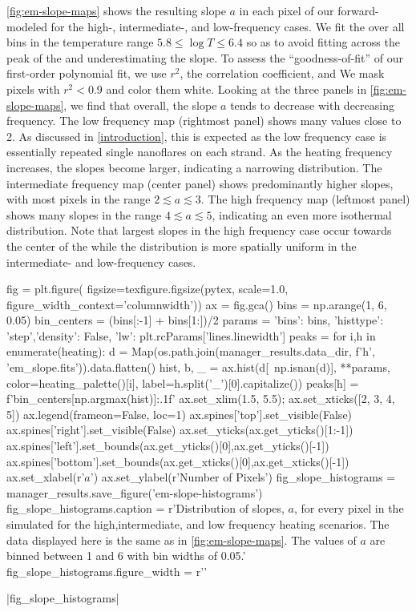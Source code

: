 \autoref{fig:em-slope-maps} shows the resulting \dem{} slope $a$ in each pixel of our forward-modeled \AR{} for the high-, intermediate-, and low-frequency cases. We fit the \dem{} over all bins in the temperature range $5.8\le\log T\le6.4$ so as to avoid fitting across the peak of the \dem{} and underestimating the slope. To assess the ``goodness-of-fit'' of our first-order polynomial fit, we use $r^2$, the correlation coefficient, and We mask pixels with $r^2<0.9$ and color them white. Looking at the three panels in \autoref{fig:em-slope-maps}, we find that overall, the \dem{} slope $a$ tends to decrease with decreasing frequency. The low frequency map (rightmost panel) shows many values close to 2. As discussed in \autoref{introduction}, this is expected as the low frequency case is essentially repeated single nanoflares on each strand. As the heating frequency increases, the slopes become larger, indicating a narrowing \dem{} distribution. The intermediate frequency map (center panel) shows predominantly higher slopes, with most pixels in the range $2\lesssim a \lesssim 3$. The high frequency map (leftmost panel) shows many slopes in the range $4\lesssim a\lesssim5$, indicating an even more isothermal distribution. Note that largest slopes in the high frequency case occur towards the center of the \AR{} while the distribution is more spatially uniform in the intermediate- and low-frequency cases.

\begin{pycode}
fig = plt.figure(
    figsize=texfigure.figsize(pytex, scale=1.0, figure_width_context='columnwidth'))
ax = fig.gca()
bins = np.arange(1, 6, 0.05)
bin_centers = (bins[:-1] + bins[1:])/2
params = {'bins': bins, 'histtype': 'step','density': False, 
          'lw': plt.rcParams['lines.linewidth']}
peaks = {}
for i,h in enumerate(heating):
    d = Map(os.path.join(manager_results.data_dir, f'{h}', 'em_slope.fits')).data.flatten()
    hist, b, _ = ax.hist(d[~np.isnan(d)], **params, color=heating_palette()[i],
                         label=h.split('_')[0].capitalize())
    peaks[h] = f'{bin_centers[np.argmax(hist)]:.1f}'
ax.set_xlim(1.5, 5.5);
ax.set_xticks([2, 3, 4, 5])
ax.legend(frameon=False, loc=1)
ax.spines['top'].set_visible(False)
ax.spines['right'].set_visible(False)
ax.set_yticks(ax.get_yticks()[1:-1])
ax.spines['left'].set_bounds(ax.get_yticks()[0],ax.get_yticks()[-1])
ax.spines['bottom'].set_bounds(ax.get_xticks()[0],ax.get_xticks()[-1])
ax.set_xlabel(r'$a$')
ax.set_ylabel(r'Number of Pixels')
fig_slope_histograms = manager_results.save_figure('em-slope-histograms')
fig_slope_histograms.caption = r'Distribution of \dem{} slopes, $a$, for every pixel in the simulated \AR{} for the high,intermediate, and low frequency heating scenarios. The data displayed here is the same as in \autoref{fig:em-slope-maps}. The values of $a$ are binned between 1 and 6 with bin widths of 0.05.'
fig_slope_histograms.figure_width = r'\columnwidth' 
\end{pycode}
|fig_slope_histograms|

